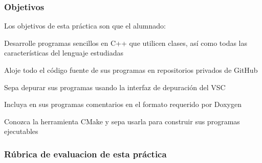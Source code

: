 \subsubsection*{Objetivos}

Los objetivos de esta práctica son que el alumnado\+:
\begin{DoxyItemize}
\item Desarrolle programas sencillos en C++ que utilicen clases, así como todas las características del lenguaje estudiadas
\item Aloje todo el código fuente de sus programas en repositorios privados de Git\+Hub
\item Sepa depurar sus programas usando la interfaz de depuración del V\+SC
\item Incluya en sus programas comentarios en el formato requerido por Doxygen
\item Conozca la herramienta C\+Make y sepa usarla para construir sus programas ejecutables
\end{DoxyItemize}

\subsubsection*{Rúbrica de evaluacion de esta práctica}

